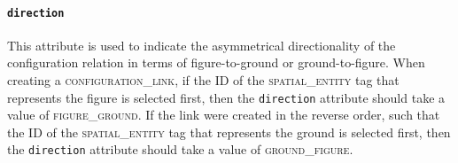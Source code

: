 \documentclass[11pt]{article}
\newcommand{\entity}[2]{[\textbf{\color{darkblue}#1}$_{se#2}$]}
\begin{document}




\paragraph{\texttt{direction}} %
\label{par:direction}
This attribute is used to indicate the asymmetrical directionality of the configuration relation in terms of figure-to-ground or ground-to-figure. When creating a \textsc{configuration\_link}, if the ID of the \textsc{spatial\_entity} tag that represents the figure is selected first, then the \texttt{direction} attribute should take a value of \textsc{figure\_ground}. If the link were created in the reverse order, such that the ID of the \textsc{spatial\_entity} tag that represents the ground is selected first, then the \texttt{direction} attribute should take a value of \textsc{ground\_figure}.





\end{document}
